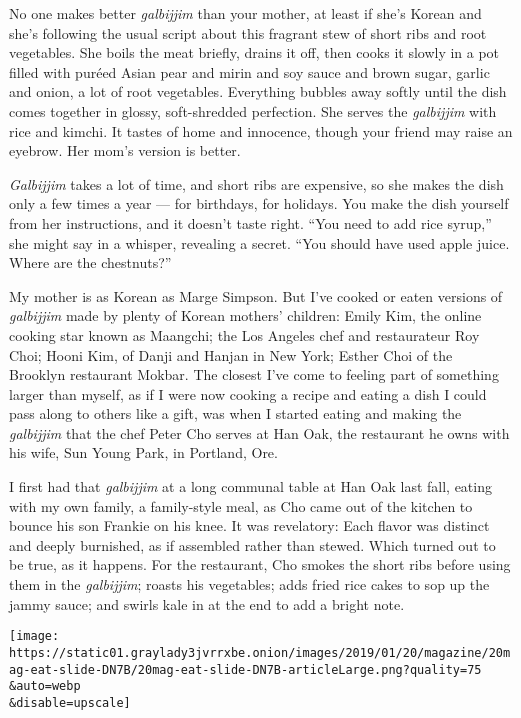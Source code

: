 No one makes better \emph{galbijjim} than your mother, at least if she's
Korean and she's following the usual script about this fragrant stew of
short ribs and root vegetables. She boils the meat briefly, drains it
off, then cooks it slowly in a pot filled with puréed Asian pear and
mirin and soy sauce and brown sugar, garlic and onion, a lot of root
vegetables. Everything bubbles away softly until the dish comes together
in glossy, soft-shredded perfection. She serves the \emph{galbijjim}
with rice and kimchi. It tastes of home and innocence, though your
friend may raise an eyebrow. Her mom's version is better.

\emph{Galbijjim} takes a lot of time, and short ribs are expensive, so
she makes the dish only a few times a year --- for birthdays, for
holidays. You make the dish yourself from her instructions, and it
doesn't taste right. ``You need to add rice syrup,'' she might say in a
whisper, revealing a secret. ``You should have used apple juice. Where
are the chestnuts?''

My mother is as Korean as Marge Simpson. But I've cooked or eaten
versions of \emph{galbijjim} made by plenty of Korean mothers' children:
Emily Kim, the online cooking star known as Maangchi; the Los Angeles
chef and restaurateur Roy Choi; Hooni Kim, of Danji and Hanjan in New
York; Esther Choi of the Brooklyn restaurant Mokbar. The closest I've
come to feeling part of something larger than myself, as if I were now
cooking a recipe and eating a dish I could pass along to others like a
gift, was when I started eating and making the \emph{galbijjim} that the
chef Peter Cho serves at Han Oak, the restaurant he owns with his wife,
Sun Young Park, in Portland, Ore.

I first had that \emph{galbijjim} at a long communal table at Han Oak
last fall, eating with my own family, a family-style meal, as Cho came
out of the kitchen to bounce his son Frankie on his knee. It was
revelatory: Each flavor was distinct and deeply burnished, as if
assembled rather than stewed. Which turned out to be true, as it
happens. For the restaurant, Cho smokes the short ribs before using them
in the \emph{galbijjim}; roasts his vegetables; adds fried rice cakes to
sop up the jammy sauce; and swirls kale in at the end to add a bright
note.

\texttt{[image: https://static01.graylady3jvrrxbe.onion/images/2019/01/20/magazine/20mag-eat-slide-DN7B/20mag-eat-slide-DN7B-articleLarge.png?quality=75\\\&auto=webp\\\&disable=upscale]}

